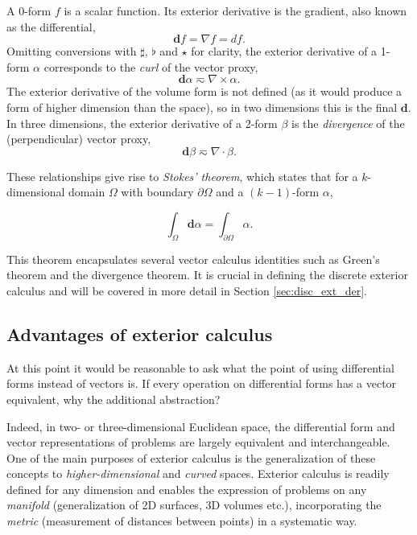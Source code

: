 \documentclass[utf8,english]{gradu3}
\begin{document}
A 0-form $f$ is a scalar function.
Its exterior derivative is the gradient, also known as the differential,
\[
  \mathbf{d}f = \nabla f = df.
\]
Omitting conversions with $\sharp$, $\flat$ and $\star$ for clarity,
the exterior derivative of a 1-form $\alpha$ corresponds to the
\textit{curl} of the vector proxy,
\[
  \mathbf{d}\alpha \eqsim \nabla \times \alpha.
\]
The exterior derivative of the volume form is not defined
(as it would produce a form of higher dimension than the space),
so in two dimensions this is the final $\mathbf{d}$.
In three dimensions, the exterior derivative of a 2-form $\beta$
is the \textit{divergence} of the (perpendicular) vector proxy,
\[
  \mathbf{d}\beta \eqsim \nabla \cdot \beta.
\]

These relationships give rise to \textit{Stokes' theorem},
which states that for a $k$-dimensional domain $\Omega$
with boundary $\partial \Omega$ and a $(k-1)$-form $\alpha$,

\begin{equation}\label{eq:stokes_theorem}
  \int_{\Omega} \mathbf{d}\alpha = \int_{\partial\Omega} \alpha.
\end{equation}

This theorem encapsulates several vector calculus identities
such as Green's theorem and the divergence theorem.
It is crucial in defining the discrete exterior calculus
and will be covered in more detail in Section \ref{sec:disc_ext_der}.

\subsection{Advantages of exterior calculus}

At this point it would be reasonable to ask what the point of
using differential forms instead of vectors is.
If every operation on differential forms has a vector equivalent,
why the additional abstraction?

Indeed, in two- or three-dimensional Euclidean space,
the differential form and vector representations of problems
are largely equivalent and interchangeable.
One of the main purposes of exterior calculus
is the generalization of these concepts to \textit{higher-dimensional}
and \textit{curved} spaces.
Exterior calculus is readily defined for any dimension
and enables the expression of problems on any \textit{manifold}
(generalization of 2D surfaces, 3D volumes etc.),
incorporating the \textit{metric} (measurement of distances between points)
in a systematic way.
\end{document}
